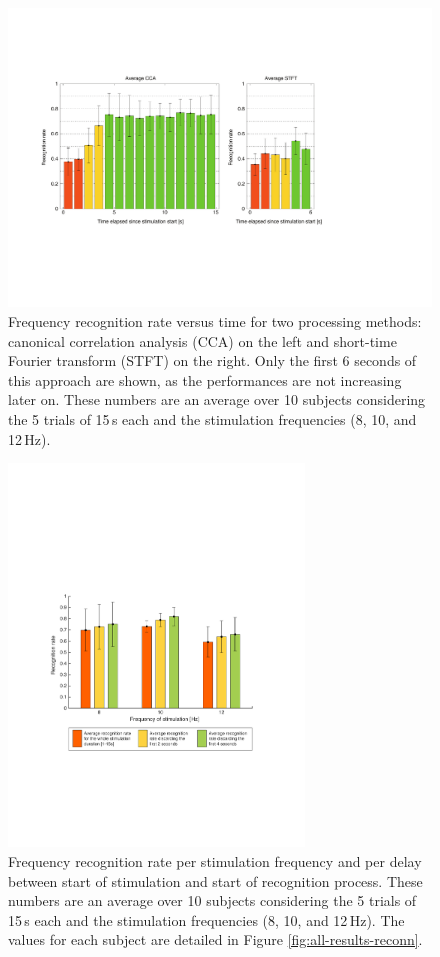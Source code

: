 \documentclass[smallextended]{svjour3}
\begin{document}
\begin{figure}
\center
\includegraphics[width=\textwidth]{figures/all_time_reconn_2.pdf}
\caption{Frequency recognition rate versus time for two processing methods: canonical correlation analysis (CCA) on the left and short-time Fourier transform (STFT) on the right. Only the first 6 seconds of this approach are shown, as the performances are not increasing later on. These numbers are an average over 10 subjects considering the 5 trials of 15\,s each and the stimulation frequencies (8, 10, and 12\,Hz).} \label{fig:all_time_reconn}
\end{figure}

\begin{figure}
\center
\includegraphics[width=0.7\textwidth]{figures/taux-reconn.pdf}
\caption{Frequency recognition rate per stimulation frequency and per delay between start of stimulation and start of recognition process. These numbers are an average over 10 subjects considering the 5 trials of 15\,s each and the stimulation frequencies (8, 10, and 12\,Hz). The values for each subject are detailed in Figure \ref{fig:all-results-reconn}.}
\label{fig:taux-reconn}
\end{figure}
\end{document}
